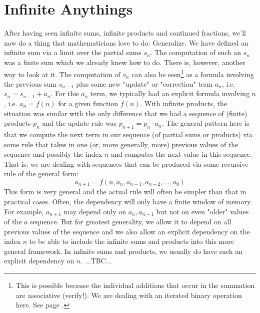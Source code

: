 \section{Infinite Anythings}
After having seen infinite sums, infinite products and continued fractions, we'll now do a thing that mathematicians love to do: Generalize. We have defined an infinite sum via a limit over the partial sums $s_n$. The computation of such an $s_n$ was a finite sum which we already knew how to do. There is, however, another way to look at it. The computation of $s_n$ can also be seen\footnote{This is possible because the individual additions that occur in the summation are associative (verify!). We are dealing with an iterated binary operation here. See page \pageref{Sec:IteratedBinaryOperations}.} as a formula involving the previous sum $s_{n-1}$ plus some new "update" or "correction" term $a_n$, i.e. $s_n = s_{n-1} + a_n$. For this $a_n$ term, we typically had an explicit formula involving $n$, i.e. $a_n = f(n)$ for a given function $f(n)$. With infinite products, the situation was similar with the only difference that we had a sequence of (finite) products $p_n$ and the update rule was $p_{n+1} = p_n \cdot a_n$. The general pattern here is that we compute the next term in our sequence (of partial sums or products) via some rule that takes in one (or, more generally, more) previous values of the sequence and possibly the index $n$ and computes the next value in this sequence. That is: we are dealing with sequences that can be produced via some recursive rule of the general form:
\begin{equation}
a_{n+1} = f(n, a_n, a_{n-1}, a_{n-2}, \ldots, a_0)
\end{equation}
This form is very general and the actual rule will often be simpler than that in practical cases. Often, the dependency will only have a finite window of memory. For example, $a_{n+1}$ may depend only on $a_n, a_{n-1}$ but not on even "older" values of the $a$ sequence. But for greatest generality, we allow it to depend on all previous values of the sequence and we also allow an explicit dependency on the index $n$ to be able to include the infinite sums and products into this more general framework. In infinite sums and products, we usually do have such an explicit dependency on $n$. ...TBC...

%
%
%


